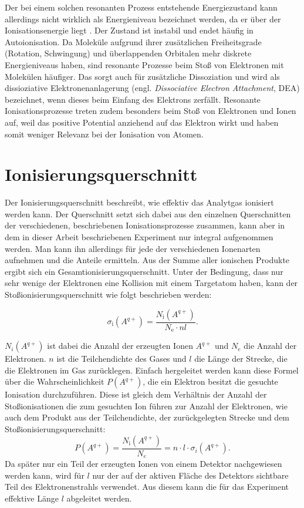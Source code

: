 Der bei einem solchen resonanten Prozess entstehende Energiezustand kann allerdings nicht wirklich als Energieniveau bezeichnet werden, da er über der Ionisationsenergie liegt \cite{EII}. Der Zustand ist instabil und endet häufig in Autoionisation. Da Moleküle aufgrund ihrer zusätzlichen Freiheitsgrade (Rotation, Schwingung) und überlappenden Orbitalen mehr diskrete Energieniveaus haben, sind resonante Prozesse beim Stoß von Elektronen mit Molekülen häufiger. Das sorgt auch für zusätzliche Dissoziation und wird als dissioziative Elektronenanlagerung (engl. \textit{Dissociative Electron Attachment}, DEA) bezeichnet, wenn dieses beim Einfang des Elektrons zerfällt. Resonante Ionisationsprozesse treten zudem besonders beim Stoß von Elektronen und Ionen auf, weil das positive Potential anziehend auf das Elektron wirkt und haben somit weniger Relevanz bei der Ionisation von Atomen.

\section{Ionisierungsquerschnitt}
Der Ionisierungsquerschnitt beschreibt, wie effektiv das Analytgas ionisiert werden kann. Der Querschnitt setzt sich dabei aus den einzelnen Querschnitten der verschiedenen, beschriebenen Ionisationsprozesse zusammen, kann aber in dem in dieser Arbeit beschriebenen Experiment nur integral aufgenommen werden. Man kann ihn allerdings für jede der verschiedenen Ionenarten aufnehmen und die Anteile ermitteln. Aus der Summe aller ionischen Produkte ergibt sich ein Gesamtionisierungsquerschnitt. Unter der Bedingung, dass nur sehr wenige der Elektronen eine Kollision mit einem Targetatom haben, kann der Stoßionisierungsquerschnitt wie folgt beschrieben werden:

\begin{equation}
    \sigma_{\text{i}}(A^{q+}) = \frac{N_{\text{i}}(A^{q+})}{N_{\text{e}} \cdot n l}.
\end{equation}

$N_i(A^{q+})$ ist dabei die Anzahl der erzeugten Ionen $A^{q+}$ und $N_e$ die Anzahl der Elektronen. $n$ ist die Teilchendichte des Gases und $l$ die Länge der Strecke, die die Elektronen im Gas zurücklegen. Einfach hergeleitet werden kann diese Formel über die Wahrscheinlichkeit $P(A^{q+})$, die ein Elektron besitzt die gesuchte Ionisation durchzuführen. Diese ist gleich dem Verhältnis der Anzahl der Stoßionisationen die zum gesuchten Ion führen zur Anzahl der Elektronen, wie auch dem Produkt aus der Teilchendichte, der zurückgelegten Strecke und dem Stoßionisierungsquerschnitt: 
\begin{equation}
    P(A^{q+}) = \frac{N_{\text{i}}(A^{q+})}{N_e} = n \cdot l \cdot \sigma_i(A^{q+}).
\end{equation}
Da später nur ein Teil der erzeugten Ionen von einem Detektor nachgewiesen werden kann, wird für $l$ nur der auf der aktiven Fläche des Detektors sichtbare Teil des Elektronenstrahls verwendet. Aus diesem kann die für das Experiment effektive Länge $l$ abgeleitet werden.

